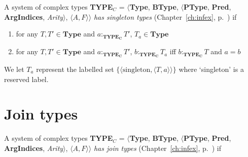 A system of complex types {\bf TYPE$_C$} = $\langle${\bf Type}, {\bf BType},
$\langle$\textbf{PType}, {\bf Pred}, \textbf{ArgIndices}, {\it
  Arity\/}$\rangle$, $\langle A,F\rangle$$\rangle$ \textit{has
  singleton types} (Chapter~\ref{ch:infex}, p.~\pageref{ex:singleton-types}) if
 
 
   
 

\begin{enumerate} 
 
\item for any $T,T' \in \textbf{Type}$ and $a:_{\mathbf{TYPE_C}}T'$, $T_a \in \textbf{Type}$ 
 
\item for any $T,T' \in \textbf{Type}$ and $a:_{\mathbf{TYPE_C}}T'$, 
$b:_{\mathbf{TYPE_C}}T_a$ iff  $b:_{\mathbf{TYPE_C}}T$ and $a=b$
   
 
\end{enumerate}


We let $T_a$ represent the labelled set
$\{\langle\mathrm{singleton},\langle T,a\rangle\rangle\}$ where `singleton' is a reserved
label.
 
\section{Join types}
\label{app:jointypes}


A system of complex types {\bf TYPE$_C$} = $\langle${\bf Type}, {\bf BType},
$\langle$\textbf{PType}, {\bf Pred}, \textbf{ArgIndices}, {\it
  Arity\/}$\rangle$, $\langle A,F\rangle$$\rangle$ \textit{has join
  types} (Chapter~\ref{ch:infex}, p.~\pageref{ex:jointypes}) if 

